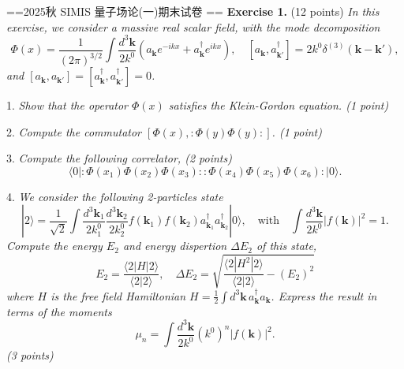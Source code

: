 
==2025秋 SIMIS 量子场论(一)期末试卷 ==
\textbf{Exercise 1.} (12 points) \textit{In this exercise, we consider a massive real scalar field, with the mode decomposition}
\begin{equation}
\Phi(x) = \frac{1}{(2\pi)^{3/2}} \int \frac{d^3\mathbf{k}}{2k^0} (a_{\mathbf{k}} e^{-ikx} + a^\dagger_{\mathbf{k}} e^{ikx}), \quad [a_{\mathbf{k}}, a^\dagger_{\mathbf{k}'}] = 2k^0 \delta^{(3)}(\mathbf{k} - \mathbf{k}'),
\end{equation}
\textit{and $[a_{\mathbf{k}}, a_{\mathbf{k}'}] = [a^\dagger_{\mathbf{k}}, a^\dagger_{\mathbf{k}'}] = 0$.}

1. \textit{Show that the operator $\Phi(x)$ satisfies the Klein-Gordon equation. (1 point)}

2. \textit{Compute the commutator $[\Phi(x), :\Phi(y)\Phi(y):]$. (1 point)}

3. \textit{Compute the following correlator, (2 points)}
\begin{equation}
\langle 0 | : \Phi(x_1)\Phi(x_2)\Phi(x_3) : : \Phi(x_4)\Phi(x_5)\Phi(x_6) : | 0 \rangle.
\end{equation}

4. \textit{We consider the following 2-particles state}
\begin{equation}
|2\rangle = \frac{1}{\sqrt{2}} \int \frac{d^3\mathbf{k}_1}{2k^0_1} \frac{d^3\mathbf{k}_2}{2k^0_2} f(\mathbf{k}_1)f(\mathbf{k}_2) a^\dagger_{\mathbf{k}_1} a^\dagger_{\mathbf{k}_2} |0\rangle, \quad \text{with} \quad \int \frac{d^3\mathbf{k}}{2k^0} |f(\mathbf{k})|^2 = 1.
\end{equation}
\textit{Compute the energy $E_2$ and energy dispertion $\Delta E_2$ of this state,}
\begin{equation}
E_2 = \frac{\langle 2 | H | 2 \rangle}{\langle 2 | 2 \rangle}, \quad \Delta E_2 = \sqrt{\frac{\langle 2 | H^2 | 2 \rangle}{\langle 2 | 2 \rangle} - (E_2)^2}
\end{equation}
\textit{where $H$ is the free field Hamiltonian $H = \frac{1}{2} \int d^3\mathbf{k} \, a^\dagger_{\mathbf{k}} a_{\mathbf{k}}$. Express the result in terms of the moments}
\begin{equation}
\mu_n = \int \frac{d^3\mathbf{k}}{2k^0} (k^0)^n |f(\mathbf{k})|^2.
\end{equation}
\textit{(3 points)}

